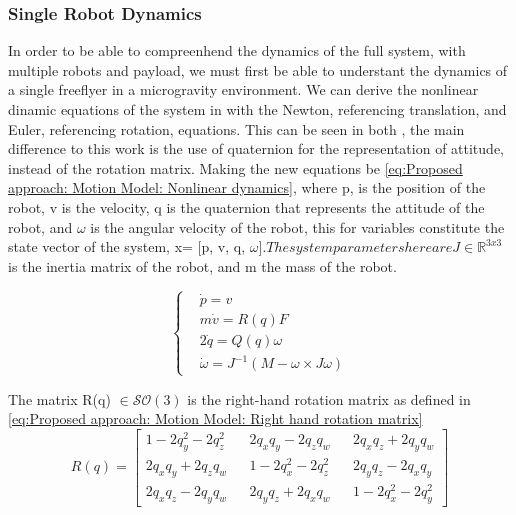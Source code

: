 \subsubsection{Single Robot Dynamics}
In order to be able to compreenhend the dynamics of the full system, with multiple robots and payload, we must first be able to understant the dynamics of a single freeflyer in a microgravity environment. We can derive the nonlinear dinamic equations of the system in with the Newton, referencing translation, and Euler, referencing rotation, equations. This can be seen in both \cite{RoqueVentura2016spacecobot}, the main difference to this work is the use of quaternion for the representation of attitude, instead of the rotation matrix. Making the new equations be \ref{eq:Proposed approach: Motion Model: Nonlinear dynamics}, where p, is the position of the robot, v is the velocity, q is the quaternion that represents the attitude of the robot, and $\omega$ is the angular velocity of the robot, this for variables constitute the state vector of the system, x= [p, v, q, $\omega]. The system parameters here are J \in \mathbb{R}^{3x3}$ is the inertia matrix of the robot, and m the mass of the robot.

\begin{equation}
    \begin{cases}
        &\dot{p} = v \\
        &m\dot{v} = R(q)F \\
        &2\dot{q} = Q(q) \omega \\ 
        &\dot{\omega} = J^{-1} \left(M -\omega \times J\omega \right) 
    \end{cases}
    \label{eq:Proposed approach: Motion Model: Nonlinear dynamics}
\end{equation}

The matrix R(q) $\in \mathcal{SO}(3)$ is the right-hand rotation matrix as defined in \ref{eq:Proposed approach: Motion Model: Right hand rotation matrix}
\begin{equation}
    R\left(q\right) = 
    \begin{bmatrix}
    1 - 2q_{y}^{2} - 2q_{z}^{2} && 2q_{x}q_{y} - 2q_{z}q_{w} && 2q_{x}q_{z}+2q_{y}q_{w} \\
        2q_{x}q_{y} + 2q_{z}q_{w} && 1-2q_{x}^{2}-2q_{z}^{2} && 2q_{y}q_{z}-2q_{x}q_{y} \\
        2q_{x}q_{z} - 2q_{y}q_{w} && 2q_{y}q_{z}+2q_{x}q_{w} && 1-2q_{x}^{2}-2q_{y}^{2}
    \end{bmatrix}
    \label{eq:Proposed approach: Motion Model: Right hand rotation matrix}
\end{equation}

